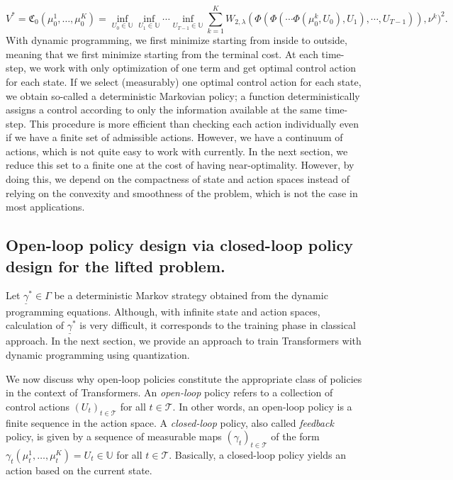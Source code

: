 \documentclass[11pt]{article}
\newcommand{\UU}{\mathbb{U}}
\newcommand{\cT}{\mathcal{T}}
\newcommand{\fC}{\mathfrak{C}}
\begin{document}
\begin{equation*}
    V^* = \fC_0(\mu_0^1,\ldots,\mu_0^K) = \inf_{U_0\in\UU}\inf_{U_1\in\UU}\cdots\inf_{U_{T-1}\in\UU}\sum_{k=1}^KW_{2,\lambda}(\Phi(\Phi(\cdots\Phi(\mu_0^k, U_0),U_1),\cdots,U_{T-1})), \nu^k)^2.
\end{equation*}
With dynamic programming, we first minimize starting from inside to outside, meaning that we first minimize starting from the terminal cost. At each time-step, we work with only optimization of one term and get optimal control action for each state. If we select (measurably) one optimal control action for each state, we obtain so-called a deterministic Markovian policy; a function deterministically assigns a control according to only the information available at the same time-step. This procedure is more efficient than checking each action individually even if we have a finite set of admissible actions. However, we have a continuum of actions, which is not quite easy to work with currently. In the next section, we reduce this set to a finite one at the cost of having near-optimality. However, by doing this, we depend on the compactness of state and action spaces instead of relying on the convexity and smoothness of the problem, which is not the case in most applications.

\subsection{Open-loop policy design via closed-loop policy design for the lifted problem.}
Let $\underline{\gamma}^*\in\Gamma$ be a deterministic Markov strategy obtained from the dynamic programming equations. Although, with infinite state and action spaces, calculation of $\underline{\gamma}^*$ is very difficult, it corresponds to the training phase in classical approach. In the next section, we provide an approach to train Transformers with dynamic programming using quantization. 

We now discuss why open-loop policies constitute the appropriate class of policies in the context of Transformers. An \emph{open-loop} policy refers to a collection of control actions $(U_t)_{t\in\cT}$ for all $t\in\cT$. In other words, an open-loop policy is a finite sequence in the action space. A \emph{closed-loop} policy, also called \emph{feedback} policy, is given by a sequence of measurable maps $(\gamma_t)_{t\in\cT}$ of the form $\gamma_t(\mu_t^1,\ldots,\mu_t^K) = U_t\in\UU$ for all $t\in\cT$. Basically, a closed-loop policy yields an action based on the current state. 
\end{document}

